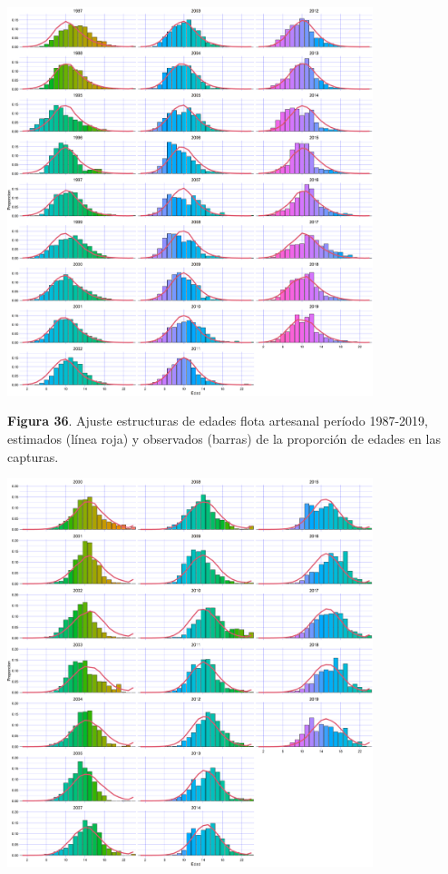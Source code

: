 \documentclass[
  spanish,
]{article}
\begin{document}
\begin{center}
\includegraphics[width=0.8\textwidth]{Figuras/FitAgeArtesanal.png}
\end{center}

\small \textbf{Figura 36}. Ajuste estructuras de edades flota artesanal
período 1987-2019, estimados (línea roja) y observados (barras) de la
proporción de edades en las capturas. \vspace{0.5cm} \normalsize

\begin{center}
\includegraphics[width=0.8\textwidth]{Figuras/FitAgeCrucero.png}
\end{center}
\end{document}
